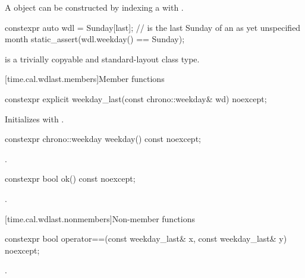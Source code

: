 \pnum
\begin{note}
A  object
can be constructed by indexing a  with .
\end{note}
\begin{example}
\begin{codeblock}
constexpr auto wdl = Sunday[last];      //  is the last Sunday of an as yet unspecified month
static_assert(wdl.weekday() == Sunday);
\end{codeblock}
\end{example}

\pnum
{} is a trivially copyable and standard-layout class type.

[time.cal.wdlast.members]{Member functions}

%
\begin{itemdecl}
constexpr explicit weekday_last(const chrono::weekday& wd) noexcept;
\end{itemdecl}

\begin{itemdescr}
\pnum
\effects
Initializes  with .
\end{itemdescr}

%
\begin{itemdecl}
constexpr chrono::weekday weekday() const noexcept;
\end{itemdecl}

\begin{itemdescr}
\pnum
\returns
{}.
\end{itemdescr}

%
\begin{itemdecl}
constexpr bool ok() const noexcept;
\end{itemdecl}

\begin{itemdescr}
\pnum
\returns
{}.
\end{itemdescr}

[time.cal.wdlast.nonmembers]{Non-member functions}

%
\begin{itemdecl}
constexpr bool operator==(const weekday_last& x, const weekday_last& y) noexcept;
\end{itemdecl}

\begin{itemdescr}
\pnum
\returns
{}.
\end{itemdescr}

